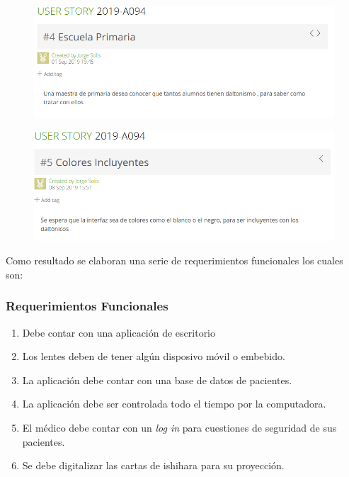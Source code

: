 \documentclass[10pt]{article}
\begin{document}
\begin{figure}[H]
	\begin{center}
\includegraphics[scale = 0.55]{HS/US4.png}
	\end{center} 
\end{figure}

\begin{figure}[H]
	\begin{center}
\includegraphics[scale = 0.55]{HS/US5.png}
	\end{center} 
\end{figure}

Como resultado se elaboran una serie de requerimientos funcionales los cuales son:
\subsubsection{Requerimientos Funcionales}

\begin{enumerate}
    \item Debe contar con una aplicación de escritorio
    \item Los lentes deben de tener algún disposivo móvil o embebido.
    \item La aplicación debe contar con una base de datos de pacientes.
    \item La aplicación debe ser controlada todo el tiempo por la computadora.
    \item El médico debe contar con un \textit{log in} para cuestiones de seguridad de sus pacientes.
    \item Se debe digitalizar las cartas de ishihara para su proyección.
    
\end{enumerate}
\end{document}
